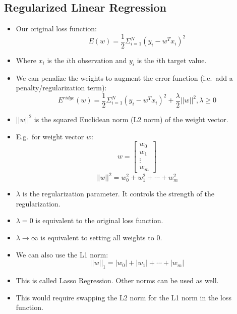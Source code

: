 \documentclass[12pt]{article}
\begin{document}
        \subsection{Regularized Linear Regression}
            \begin{itemize}
                \item Our original loss function:
                \begin{equation}
                    E(w) = \frac{1}{2} \Sigma_{i=1}^N {(y_i - {w^T}x_i)}^2
                \end{equation}
                \item Where $x_i$ is the $i$th observation and $y_i$ is the $i$th target value.
                \item We can penalize the weights to augment the error function (i.e.\ add a penalty/regularization term):
                \begin{equation}
                    E^{ridge}(w) = \frac{1}{2} \Sigma_{i=1}^N {(y_i - {w^T}x_i)}^2 + \frac{\lambda}{2} ||w||^2, \lambda \geq 0
                \end{equation}
                \item $||w||^2$ is the squared Euclidean norm (L2 norm) of the weight vector.
                \item E.g.\ for weight vector $w$:
                \begin{equation}
                    w = \begin{bmatrix}
                        w_0 \\
                        w_1 \\
                        \vdots \\
                        w_m
                    \end{bmatrix}
                \end{equation}
                \begin{equation}
                    ||w||^2 = w_0^2 + w_1^2 + \cdots + w_m^2
                \end{equation}
                \item $\lambda$ is the regularization parameter. It controls the strength of the regularization.
                \item $\lambda = 0$ is equivalent to the original loss function.
                \item $\lambda \rightarrow \infty$ is equivalent to setting all weights to $0$.
                \item We can also use the L1 norm:
                \begin{equation}
                    ||w||_1 = |w_0| + |w_1| + \cdots + |w_m|
                \end{equation}
                \item This is called Lasso Regression. Other norms can be used as well.
                \item This would require swapping the L2 norm for the L1 norm in the loss function.
            \end{itemize}
\end{document}

